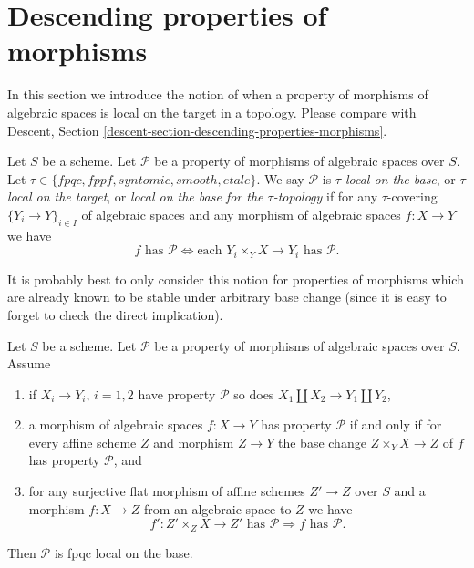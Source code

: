 \section{Descending properties of morphisms}
\label{section-descending-properties-morphisms}

\noindent
In this section we introduce the notion of when a property of morphisms of
algebraic spaces is local on the target in a topology. Please compare with
Descent, Section \ref{descent-section-descending-properties-morphisms}.

\begin{definition}
\label{definition-property-morphisms-local}
Let $S$ be a scheme.
Let $\mathcal{P}$ be a property of morphisms of algebraic spaces over $S$.
Let $\tau \in \{fpqc, fppf, syntomic, smooth, etale\}$.
We say $\mathcal{P}$ is {\it $\tau$ local on the base}, or
{\it $\tau$ local on the target}, or
{\it local on the base for the $\tau$-topology} if for any
$\tau$-covering $\{Y_i \to Y\}_{i \in I}$ of algebraic spaces
and any morphism of algebraic spaces $f : X \to Y$ we 
have
$$
f \text{ has }\mathcal{P}
\Leftrightarrow
\text{each }Y_i \times_Y X \to Y_i\text{ has }\mathcal{P}.
$$
\end{definition}

\noindent
It is probably best to only consider this notion for properties of morphisms
which are already known to be stable under arbitrary base change (since it is
easy to forget to check the direct implication).

\begin{lemma}
\label{lemma-descending-properties-morphisms}
Let $S$ be a scheme. Let $\mathcal{P}$ be a property of morphisms of
algebraic spaces over $S$. Assume
\begin{enumerate}
\item if $X_i \to Y_i$, $i = 1, 2$ have property $\mathcal{P}$ so
does $X_1 \amalg X_2 \to Y_1 \amalg Y_2$,
\item a morphism of algebraic spaces $f : X \to Y$ has property
$\mathcal{P}$ if and only if for every affine scheme $Z$ and
morphism $Z \to Y$ the base change $Z \times_Y X \to Z$ of $f$
has property $\mathcal{P}$, and
\item for any surjective flat morphism of affine schemes
$Z' \to Z$ over $S$ and a morphism $f : X \to Z$ from an algebraic space
to $Z$ we have
$$
f' : Z' \times_Z X \to Z'\text{ has }\mathcal{P}
\Rightarrow
f\text{ has }\mathcal{P}.
$$
\end{enumerate}
Then $\mathcal{P}$ is fpqc local on the base.
\end{lemma}

